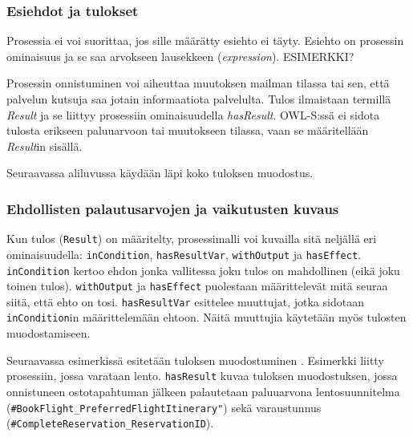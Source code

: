 \documentclass[finnish]{tktltiki2}
\theoremstyle{definition}
\theoremstyle{remark}
\begin{document}
\subsubsection{Esiehdot ja tulokset}

Prosessia ei voi suorittaa, jos sille määrätty esiehto ei täyty\cite{OWLS}. Esiehto on prosessin ominaisuus ja se saa arvokseen lausekkeen (\textit{expression}). ESIMERKKI?

Prosessin onnistuminen voi aiheuttaa muutoksen mailman tilassa tai sen, että palvelun kutsuja saa jotain informaatiota palvelulta. Tulos ilmaistaan termillä \textit{Result} ja se liittyy prosessiin ominaisuudella \textit{hasResult}. OWL-S:ssä ei sidota tulosta erikseen paluuarvoon tai muutokseen tilassa, vaan se määritellään \textit{Result}in sisällä\cite{OWLS}. 

Seuraavassa aliluvussa käydään läpi koko tuloksen muodostus.

\subsubsection{Ehdollisten palautusarvojen ja vaikutusten kuvaus}

Kun tulos (\texttt{Result}) on määritelty, prosessimalli voi kuvailla sitä neljällä eri ominaisuudella\cite{OWLS}: \texttt{inCondition}, \texttt{hasResultVar}, \texttt{withOutput} ja \texttt{hasEffect}\cite{OWLS}.  \texttt{inCondition} kertoo ehdon jonka vallitessa joku tulos on mahdollinen (eikä joku toinen tulos). \texttt{withOutput} ja \texttt{hasEffect} puolestaan määrittelevät mitä seuraa siitä, että ehto on tosi. \texttt{hasResultVar} esittelee muuttujat, jotka sidotaan \texttt{inCondition}in määrittelemään ehtoon.  Näitä muuttujia käytetään myös tulosten muodostamiseen\cite{OWLS}. 

Seuraavassa esimerkissä esitetään tuloksen muodostuminen \cite{daml}. Esimerkki liitty prosessiin, jossa varataan lento. \texttt{hasResult} kuvaa tuloksen muodostuksen, jossa onnistuneen ostotapahtuman jälkeen palautetaan paluuarvona lentosuunnitelma (\texttt{\#BookFlight\_PreferredFlightItinerary"}) sekä varaustunnus (\texttt{\#CompleteReservation\_ReservationID}). 
\end{document}
